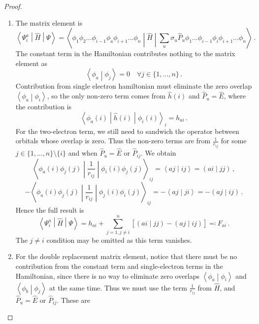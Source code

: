 \documentclass{article}
\theoremstyle{plain}\theoremheaderfont{\normalfont\itshape}\theorembodyfont{\rmfamily}\theoremseparator{.}\newtheorem*{rem}{Remark}\newtheorem*{ex}{Example}\newtheorem*{proof}{Proof}\newtheorem*{altp}{Alternative proof}
\theoremstyle{plain}\theoremheaderfont{\normalfont\bfseries}\theorembodyfont{\rmfamily}\theoremseparator{.}\newtheorem{thm}{Theorem}[section]\newtheorem{lem}[thm]{Lemma}\newtheorem{prop}[thm]{Proposition}\newtheorem*{cor}{Corollary}\newtheorem{defn}[thm]{Definition}\newtheorem{clm}[thm]{Claim}\newtheorem{clminproof}{Claim}
\theoremstyle{break}\theoremheaderfont{\normalfont\itshape}\theorembodyfont{\rmfamily}\theoremseparator{.\medskip}\newtheorem*{proofskip}{Proof}\newtheorem*{exs}{Examples}\newtheorem*{rems}{Remarks}
\theoremstyle{break}\theoremheaderfont{\normalfont\bfseries}\theorembodyfont{\rmfamily}\theoremseparator{.\medskip}\newtheorem{lemskip}[thm]{Lemma}\newtheorem{defnskip}[thm]{Definition}\newtheorem{propskip}[thm]{Proposition}\newtheorem{thmskip}[thm]{Theorem}
\numberwithin{equation}{section}
\newcommand{\braket}[2]{\left\langle #1 \middle| #2 \right\rangle}
\newcommand{\mel}[3]{\left\langle #1 \middle| #2 \middle| #3 \right\rangle}
\newcommand{\bracket}[2]{\left( #1 \middle| #2 \right)}
\begin{document}
    \begin{proof}
        \begin{enumerate}[topsep=0pt,label=(\roman*)]
            \item The matrix element is
            \begin{equation}
                \mel{\Psi_i^a}{\hat{H}}{\Psi}=\mel{\phi_1\phi_2\dots\phi_{i-1}\phi_a\phi_{i+1}\dots\phi_n}{\hat{H}}{\sum_u\sigma_u\hat{P}_u\phi_1\dots\phi_{i-1}\phi_i\phi_{i+1}\dots\phi_n}\,.
            \end{equation}
            The constant term in the Hamiltonian contributes nothing to the matrix element as
            \begin{equation}
                \braket{\phi_a}{\phi_j}=0\quad\forall j\in\{1,\dots,n\}\,.
            \end{equation}
            Contribution from single electron hamiltonian must eliminate the zero overlap \(\braket{\phi_a}{\phi_i}\), so the only non-zero term comes from \(\hat{h}(i)\) and \(\hat{P}_u=\hat{E}\), where the contribution is
            \begin{equation}
                \mel{\phi_a(i)}{\hat{h}(i)}{\phi_i(i)}_i=h_{ai}\,.
            \end{equation}
            For the two-electron term, we still need to sandwich the operator between orbitals whose overlap is zero. Thus the non-zero terms are from \(\frac{1}{r_{ij}}\) for some \(j\in\{1,\dots,n\}\setminus\{i\}\) and when \(\hat{P}_u=\hat{E}\) or \(\hat{P}_{ij}\). We obtain
            \begin{equation}
                \mel{\phi_a(i)\phi_j(j)}{\frac{1}{r_{ij}}}{\phi_i(i)\phi_j(j)}_{ij}=\braket{aj}{ij}=\bracket{ai}{jj}\,,
            \end{equation}
            \begin{equation}
                -\mel{\phi_a(i)\phi_j(j)}{\frac{1}{r_{ij}}}{\phi_j(i)\phi_i(j)}_{ij}=-\braket{aj}{ji}=-\bracket{aj}{ij}\,.
            \end{equation}
            Hence the full result is
            \begin{equation}
                \mel{\Psi_{i}^{a}}{\hat{H}}{\Psi}=h_{ai}+\sum_{j=1,j\ne i}^{n}[\bracket{ai}{jj}-\bracket{aj}{ij}]\eqqcolon F_{ai}\,.
            \end{equation}
            The \(j\ne i\) condition may be omitted as this term vanishes.
            \item For the double replacement matrix element, notice that there must be no contribution from the constant term and single-electron terms in the Hamiltonian, since there is no way to eliminate zero overlaps \(\braket{\phi_a}{\phi_i}\) and \(\braket{\phi_b}{\phi_j}\) at the same time. Thus we must use the term \(\frac{1}{r_{ij}}\) from \(\hat{H}\), and \(\hat{P}_{u}=\hat{E}\) or \(\hat{P}_{ij}\). These are

\end{enumerate}
\end{proof}
\end{document}
